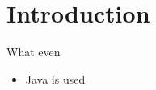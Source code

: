 \section{Introduction}

\begin{frame}{What even}
	\begin{itemize}
		\item Java is used
	\end{itemize}
\end{frame}